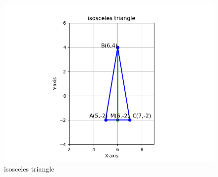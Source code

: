 \documentclass[journal]{IEEEtran}
\theoremstyle{remark}
\begin{document}
\begin{figure}[H]
    \centering
    \includegraphics[width=1\columnwidth]{figs/triangle2.png}
    \caption{isosceles triangle}
    \label{fig:placeholder_1}
\end{figure}
\end{document}
